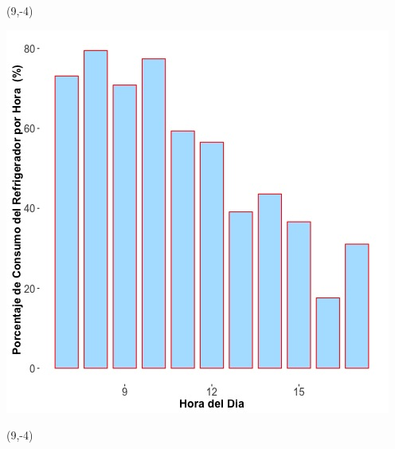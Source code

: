 \documentclass{article}\usepackage[]{graphicx}\usepackage[]{color}
\newenvironment{knitrout}{}{} %
\begin{document}
 \begin{textblock}{1}(9,-4)
\begin{minipage}{20em}
\begingroup

\endgroup
\end{minipage}
\end{textblock}

 \vspace{2cm}

\begin{knitrout}
\color{fgcolor}
\includegraphics[scale=0.65]{figure/A19_fridge_energy_pct.jpg} 
\end{knitrout}

 \begin{textblock}{1}(9,-4)
\begin{minipage}{20em}
\begingroup

\endgroup
\end{minipage}
\end{textblock}

\vspace{20cm}
\end{document}

